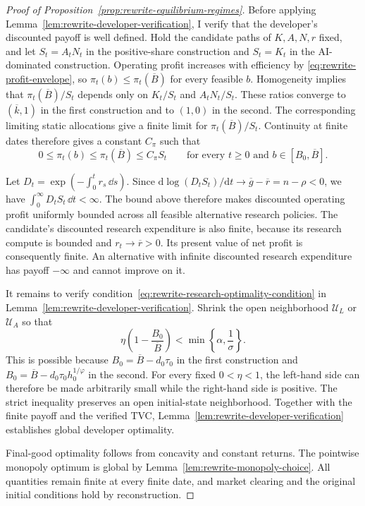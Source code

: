 \begin{proof}[Proof of Proposition~\ref{prop:rewrite-equilibrium-regimes}]
Before applying Lemma~\ref{lem:rewrite-developer-verification}, I verify
that the developer's discounted payoff is well defined.
Hold the candidate paths of $K,A,N,r$ fixed, and let $S_t=A_tN_t$
in the positive-share construction and $S_t=K_t$ in the AI-dominated
construction. Operating profit increases with efficiency by
\eqref{eq:rewrite-profit-envelope}, so $\pi_t(b)\leq\pi_t(\overline B)$
for every feasible $b$. Homogeneity implies that
$\pi_t(\overline B)/S_t$ depends only on $K_t/S_t$ and $A_tN_t/S_t$.
These ratios converge to $(\overline k,1)$ in the first construction
and to $(1,0)$ in the second. The corresponding limiting static
allocations give a finite limit for $\pi_t(\overline B)/S_t$.
Continuity at finite dates therefore gives a constant $C_\pi$ such that
\[
 0\leq\pi_t(b)\leq\pi_t(\overline B)\leq C_\pi S_t
 \qquad
 \text{for every }t\geq0
 \text{ and }b\in[B_0,\overline B].
\]

Let $D_t=\exp(-\int_0^t r_s\,\dd s)$. Since
$\mathrm d\log(D_tS_t)/\mathrm dt
\to\overline g-\overline r=n-\rho<0$,
we have $\int_0^\infty D_tS_t\,\dd t<\infty$.
The bound above therefore makes discounted operating profit uniformly
bounded across all feasible alternative research policies.
The candidate's discounted research expenditure is also finite, because
its research compute is bounded and $r_t\to\overline r>0$.
Its present value of net profit is consequently finite.
An alternative with infinite discounted research expenditure has payoff
$-\infty$ and cannot improve on it.

It remains to verify
condition~\eqref{eq:rewrite-research-optimality-condition} in
Lemma~\ref{lem:rewrite-developer-verification}.
Shrink the open neighborhood $\mathcal U_L$ or $\mathcal U_A$ so that
\[
 \eta\left(1-\frac{B_0}{\overline B}\right)
 <\min\left\{\alpha,\frac1\sigma\right\}.
\]
This is possible because $B_0=\overline B-d_0\tau_0$ in the first
construction and $B_0=\overline B-d_0\tau_0h_0^{1/\varphi}$ in the second.
For every fixed $0<\eta<1$, the left-hand side can therefore be made
arbitrarily small while the right-hand side is positive.
The strict inequality preserves an open initial-state neighborhood.
Together with the finite payoff and the verified TVC,
Lemma~\ref{lem:rewrite-developer-verification} establishes global
developer optimality.

Final-good optimality follows from concavity and constant returns.
The pointwise monopoly optimum is global by
Lemma~\ref{lem:rewrite-monopoly-choice}.
All quantities remain finite at every finite date, and market clearing and
the original initial conditions hold by reconstruction.


\end{proof}
